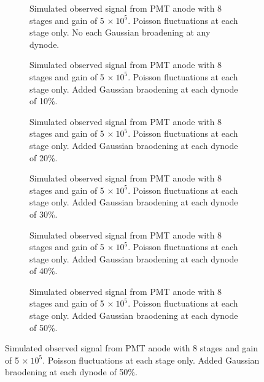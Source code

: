 \begin{figure}
\centering
\begin{subfigure}[b]{0.44\textwidth}
\caption{Simulated observed signal from PMT anode with 8 stages and gain of 5 $\times \ 10^5$. Poisson fluctuations at each stage only. No each Gaussian broadening at any dynode.}
\end{subfigure}
\hspace{3mm}
\begin{subfigure}[b]{0.44\textwidth}
\caption{Simulated observed signal from PMT anode with 8 stages and gain of 5 $\times \ 10^5$. Poisson fluctuations at each stage only. Added Gaussian braodening at each dynode of 10\%.}
\end{subfigure}

\vspace{3mm}

\begin{subfigure}[b]{0.44\textwidth}
\caption{Simulated observed signal from PMT anode with 8 stages and gain of 5 $\times \ 10^5$. Poisson fluctuations at each stage only. Added Gaussian braodening at each dynode of 20\%.}
\end{subfigure}
\hspace{3mm}
\begin{subfigure}[b]{0.44\textwidth}
\caption{Simulated observed signal from PMT anode with 8 stages and gain of 5 $\times \ 10^5$. Poisson fluctuations at each stage only. Added Gaussian braodening at each dynode of 30\%.}
\end{subfigure}

\vspace{3mm}

\begin{subfigure}[b]{0.44\textwidth}
\caption{Simulated observed signal from PMT anode with 8 stages and gain of 5 $\times \ 10^5$. Poisson fluctuations at each stage only. Added Gaussian braodening at each dynode of 40\%.}
\end{subfigure}
\hspace{3mm}
\begin{subfigure}[b]{0.44\textwidth}
\caption{Simulated observed signal from PMT anode with 8 stages and gain of 5 $\times \ 10^5$. Poisson fluctuations at each stage only. Added Gaussian braodening at each dynode of 50\%.}
\end{subfigure}
\end{figure}

